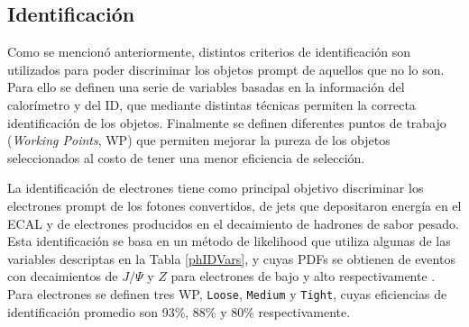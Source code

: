 
\subsection{Identificación}

Como se mencionó anteriormente, distintos criterios de identificación son utilizados para poder discriminar los objetos prompt
de aquellos que no lo son. Para ello se definen una serie de variables basadas en la información del calorímetro y del ID, que mediante distintas técnicas permiten la correcta identificación de los objetos. Finalmente se definen diferentes puntos de trabajo (\textit{Working Points}, WP) que permiten mejorar la pureza de los objetos seleccionados al costo de tener una menor eficiencia de selección.

La identificación de electrones tiene como principal objetivo discriminar los electrones prompt de los fotones convertidos, de jets que depositaron energía en el ECAL y de electrones producidos en el decaimiento de hadrones de sabor pesado. Esta identificación se basa en un método de likelihood que utiliza algunas de las variables descriptas en la Tabla \ref{phIDVars}, y cuyas PDFs se obtienen de eventos con decaimientos de $J/\Psi$ y $Z$ para electrones de bajo y alto \ET respectivamente \cite{PERF-2016-01}. Para electrones se definen tres WP, \texttt{Loose}, \texttt{Medium} y \texttt{Tight}, cuyas eficiencias de identificación promedio son  93\%, 88\% y 80\% respectivamente.

